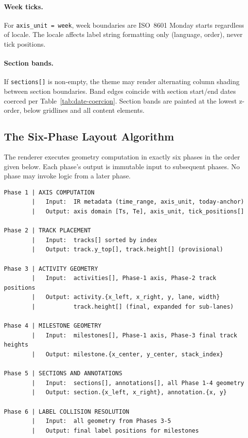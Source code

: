 \paragraph{Week ticks.}
For \texttt{axis\_unit = week}, week boundaries are ISO~8601 Monday starts regardless of
locale. The locale affects label string formatting only (language, order), never tick positions.

\paragraph{Section bands.}
If \texttt{sections[]} is non-empty, the theme may render alternating column shading between
section boundaries. Band edges coincide with section start/end dates coerced per
Table~\ref{tab:date-coercion}. Section bands are painted at the lowest z-order, below
gridlines and all content elements.

\subsection{The Six-Phase Layout Algorithm}
\label{sec:layout-algorithm}

The renderer executes geometry computation in exactly six phases in the order given below.
Each phase's output is immutable input to subsequent phases. No phase may invoke logic from
a later phase.

\begin{lstlisting}[caption={Layout pipeline overview}]
Phase 1 | AXIS COMPUTATION
        |   Input:  IR metadata (time_range, axis_unit, today-anchor)
        |   Output: axis domain [Ts, Te], axis_unit, tick_positions[]

Phase 2 | TRACK PLACEMENT
        |   Input:  tracks[] sorted by index
        |   Output: track.y_top[], track.height[] (provisional)

Phase 3 | ACTIVITY GEOMETRY
        |   Input:  activities[], Phase-1 axis, Phase-2 track positions
        |   Output: activity.{x_left, x_right, y, lane, width}
        |           track.height[] (final, expanded for sub-lanes)

Phase 4 | MILESTONE GEOMETRY
        |   Input:  milestones[], Phase-1 axis, Phase-3 final track heights
        |   Output: milestone.{x_center, y_center, stack_index}

Phase 5 | SECTIONS AND ANNOTATIONS
        |   Input:  sections[], annotations[], all Phase 1-4 geometry
        |   Output: section.{x_left, x_right}, annotation.{x, y}

Phase 6 | LABEL COLLISION RESOLUTION
        |   Input:  all geometry from Phases 3-5
        |   Output: final label positions for milestones
\end{lstlisting}

